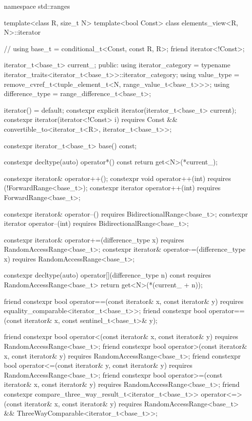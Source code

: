\begin{codeblock}
namespace std::ranges {
  template<class R, size_t N>
  template<bool Const>
  class elements_view<R, N>::iterator {                 // \expos
    using base_t = conditional_t<Const, const R, R>;
    friend iterator<!Const>;

    iterator_t<base_t> current_;
  public:
    using iterator_category = typename iterator_traits<iterator_t<base_t>>::iterator_category;
    using value_type = remove_cvref_t<tuple_element_t<N, range_value_t<base_t>>>;
    using difference_type = range_difference_t<base_t>;

    iterator() = default;
    constexpr explicit iterator(iterator_t<base_t> current);
    constexpr iterator(iterator<!Const> i)
      requires Const && convertible_to<iterator_t<R>, iterator_t<base_t>>;

    constexpr iterator_t<base_t> base() const;

    constexpr decltype(auto) operator*() const
    { return get<N>(*current_); }

    constexpr iterator& operator++();
    constexpr void operator++(int) requires (!ForwardRange<base_t>);
    constexpr iterator operator++(int) requires ForwardRange<base_t>;

    constexpr iterator& operator--() requires BidirectionalRange<base_t>;
    constexpr iterator operator--(int) requires BidirectionalRange<base_t>;

    constexpr iterator& operator+=(difference_type x)
      requires RandomAccessRange<base_t>;
    constexpr iterator& operator-=(difference_type x)
      requires RandomAccessRange<base_t>;

    constexpr decltype(auto) operator[](difference_type n) const
      requires RandomAccessRange<base_t>
    { return get<N>(*(current_ + n)); }

    friend constexpr bool operator==(const iterator& x, const iterator& y)
      requires equality_comparable<iterator_t<base_t>>;
    friend constexpr bool operator==(const iterator& x, const sentinel_t<base_t>& y);

    friend constexpr bool operator<(const iterator& x, const iterator& y)
      requires RandomAccessRange<base_t>;
    friend constexpr bool operator>(const iterator& x, const iterator& y)
      requires RandomAccessRange<base_t>;
    friend constexpr bool operator<=(const iterator& y, const iterator& y)
      requires RandomAccessRange<base_t>;
    friend constexpr bool operator>=(const iterator& x, const iterator& y)
      requires RandomAccessRange<base_t>;
    friend constexpr compare_three_way_result_t<iterator_t<base_t>>
      operator<=>(const iterator& x, const iterator& y)
        requires RandomAccessRange<base_t> && ThreeWayComparable<iterator_t<base_t>>;

}}
\end{codeblock}
